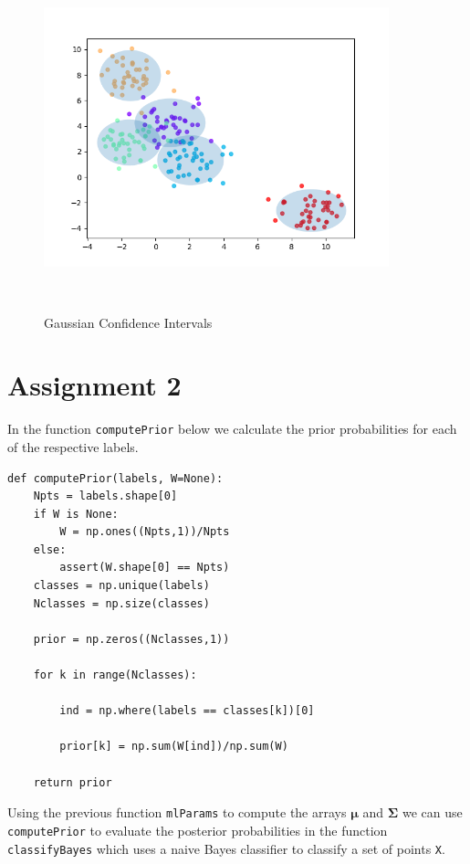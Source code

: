 \documentclass{article}
\begin{document}
\begin{figure}
    \centering
    \includegraphics[height=100mm, width=100mm]{Figure_1.png}
    \caption{Gaussian Confidence Intervals}
\end{figure}


\section*{Assignment 2}

In the function \texttt{computePrior} below we calculate the prior probabilities for each of the respective labels. 

\begin{lstlisting}
def computePrior(labels, W=None):
    Npts = labels.shape[0]
    if W is None:
        W = np.ones((Npts,1))/Npts
    else:
        assert(W.shape[0] == Npts)
    classes = np.unique(labels)
    Nclasses = np.size(classes)

    prior = np.zeros((Nclasses,1))
    
    for k in range(Nclasses):
        
        ind = np.where(labels == classes[k])[0]
        
        prior[k] = np.sum(W[ind])/np.sum(W)

    return prior
\end{lstlisting}

Using the previous function \texttt{mlParams} to compute the arrays $\boldsymbol\mu$ and $\boldsymbol\Sigma$ we can use \texttt{computePrior} to evaluate the posterior probabilities in the function \texttt{classifyBayes} which uses a naive Bayes classifier to classify a set of points \texttt{X}.
\end{document}
